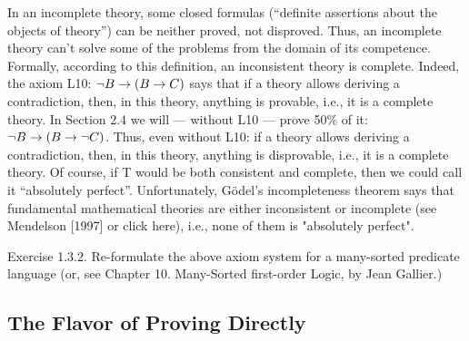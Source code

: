 In an incomplete theory, some closed formulas (``definite assertions about the objects of theory'') can be
neither proved, not disproved. Thus, an incomplete theory can't solve some of the problems from the
domain of its competence.
Formally, according to this definition, an inconsistent theory is complete. Indeed, the axiom L10:
\(\neg B\rightarrow (B\rightarrow C)\) says that if a theory allows deriving a contradiction, then, in this theory, anything is
provable, i.e., it is a complete theory. In Section 2.4 we will --- without L10 --- prove 50\% of it:
\(\neg B\rightarrow (B\rightarrow \neg C)\). Thus, even without L10: if a theory allows deriving a contradiction, then, in this theory,
anything is disprovable, i.e., it is a complete theory.
Of course, if T would be both consistent and complete, then we could call it ``absolutely perfect''.
Unfortunately, G\"{o}del's incompleteness theorem says that fundamental mathematical theories are
either inconsistent or incomplete (see Mendelson [1997] or click here), i.e., none of them is "absolutely
perfect".

Exercise 1.3.2. Re-formulate the above axiom system for a many-sorted predicate language (or, see Chapter 10. Many-Sorted first-order Logic, by Jean Gallier.)

\subsection{The Flavor of Proving Directly}

